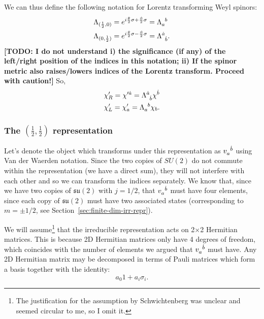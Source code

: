 \documentclass[11pt]{article}
\numberwithin{equation}{section}
\newcommand{\tn}[2]{\tensor{#1}{#2}}
\begin{document}
We can thus define the following notation for Lorentz transforming Weyl spinors:
\begin{align}
\Lambda_{(\frac{1}{2},0)} &=  e^{i \frac{\theta}{2}\sigma + \frac{\phi}{2} \sigma} = \tn{\Lambda}{_a^b}  \\
\Lambda_{(0, \frac{1}{2})} &=  e^{i \frac{\theta}{2}\sigma - \frac{\phi}{2} \sigma} = \tn{\Lambda}{^{\dot{a}}_{\dot{b}}}. \label{eq:weyl-spinor-lt}
\end{align}
\textbf{[TODO: I do not understand i) the significance (if any) of the left/right position of the indices in this notation; ii) If the spinor metric also raises/lowers indices of the Lorentz transform. Proceed with caution!]} So,
\begin{align}
\chi'_R = \chi'^{\dot{a}} = \tn{\Lambda}{^{\dot{a}}_{\dot{b}}} \chi^{\dot{b}} \\
\chi'_L = \chi'_{a} = \tn{\Lambda}{_a^b} \chi_b. \\
\end{align}

\subsubsection{The $(\frac{1}{2},\frac{1}{2})$ representation}
Let's denote the object which transforms under this representation as $\tn{v}{_a^{\dot{b}}}$ using Van der Waerden notation. Since the two copies of $SU(2)$ do not commute within the representation (we have a direct sum), they will not interfere with each other and so we can transform the indices separately. We know that, since we have two copies of $\mathfrak{su}(2)$ with $j=1/2$, that $\tn{v}{_a^{\dot{b}}}$ must have four elements, since each copy of $\mathfrak{su}(2)$ must have two associated states (corresponding to $m=\pm 1/2$, see Section~\ref{sec:finite-dim-irr-repr}).

We will assume\footnote{The justification for the assumption by Schwichtenberg was unclear and seemed circular to me, so I omit it.} that the irreducible representation acts on 2$\times$2 Hermitian matrices. This is because 2D Hermitian matrices only have 4 degrees of freedom, which coincides with the number of elements we argued that $\tn{v}{_a^{\dot{b}}}$ must have. Any 2D Hermitian matrix may be decomposed in terms of Pauli matrices which form a basis together with the identity:
\begin{equation}
a_0 1 + a_i \sigma_i.
\end{equation}
\end{document}
